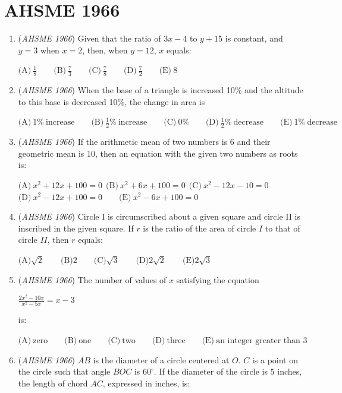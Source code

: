 \section{AHSME 1966}
        \begin{enumerate}
        	\item (\textit{AHSME 1966}) Given that the ratio of $3x - 4$ to $y + 15$ is constant, and $y = 3$ when $x = 2$, then, when $y = 12$, $x$ equals:


 $\text{(A)} \ \frac 18 \qquad \text{(B)} \ \frac 73 \qquad \text{(C)} \ \frac78 \qquad \text{(D)} \ \frac72 \qquad \text{(E)} \ 8$


	\item (\textit{AHSME 1966}) When the base of a triangle is increased 10\% and the altitude to this base is decreased 10\%, the change in area is 


 $\text{(A)}\ 1\%~\text{increase}\qquad\text{(B)}\ \frac{1}2\%~\text{increase}\qquad\text{(C)}\ 0\%\qquad\text{(D)}\ \frac{1}2\% ~\text{decrease}\qquad\text{(E)}\ 1\% ~\text{decrease}$


	\item (\textit{AHSME 1966}) If the arithmetic mean of two numbers is $6$ and their geometric mean is $10$, then an equation with the given two numbers as roots is:


 $\text{(A)} \ x^2 + 12x + 100 = 0 ~~ \text{(B)} \ x^2 + 6x + 100 = 0 ~~ \text{(C)} \ x^2 - 12x - 10 = 0$
$\text{(D)} \ x^2 - 12x + 100 = 0 \qquad \text{(E)} \ x^2 - 6x + 100 = 0$


	\item (\textit{AHSME 1966}) Circle I is circumscribed about a given square and circle II is inscribed in the given square. If $r$ is the ratio of the area of circle $I$ to that of circle $II$, then $r$ equals:


 $\text{(A)}  \sqrt 2 \qquad \text{(B)}  2 \qquad \text{(C)}  \sqrt 3 \qquad \text{(D)}  2\sqrt 2 \qquad \text{(E)}  2\sqrt 3$


	\item (\textit{AHSME 1966}) The number of values of $x$ satisfying the equation


 $\frac {2x^2 - 10x}{x^2 - 5x} = x - 3$


 is:


 $\text{(A)} \ \text{zero} \qquad \text{(B)} \ \text{one} \qquad \text{(C)} \ \text{two} \qquad \text{(D)} \ \text{three} \qquad \text{(E)} \ \text{an integer greater than 3}$


	\item (\textit{AHSME 1966}) $AB$ is the diameter of a circle centered at $O$. $C$ is a point on the circle such that angle $BOC$ is $60^\circ$. If the diameter of the circle is $5$ inches, the length of chord $AC$, expressed in inches, is:



\end{enumerate}
